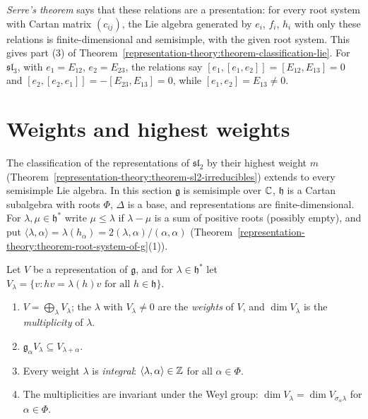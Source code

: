 \emph{Serre's theorem} \cite[Section 18.3]{humphreys-lie} says that these relations are a presentation: for every root system with Cartan matrix $(c_{ij})$, the Lie algebra generated by $e_i$,
$f_i$, $h_i$ with only these relations is finite-dimensional and semisimple, with the given root system. This gives part (3) of
Theorem~\ref{representation-theory:theorem-classification-lie}. For $\mathfrak{sl}_3$, with $e_1 = E_{12}$, $e_2 = E_{23}$, the relations say $[e_1, [e_1, e_2]] = [E_{12}, E_{13}] = 0$ and
$[e_2, [e_2, e_1]] = -[E_{23}, E_{13}] = 0$, while $[e_1, e_2] = E_{13} \neq 0$.

\section{Weights and highest weights}\label{representation-theory:section-highest-weight}

The classification of the representations of $\mathfrak{sl}_2$ by their highest weight $m$ (Theorem~\ref{representation-theory:theorem-sl2-irreducibles}) extends to every semisimple Lie
algebra. In this section $\mathfrak{g}$ is semisimple over $\mathbb{C}$, $\mathfrak{h}$ is a Cartan subalgebra with roots $\Phi$, $\Delta$ is a base, and representations are finite-dimensional.
For $\lambda, \mu \in \mathfrak{h}^*$ write $\mu \leq \lambda$ if $\lambda - \mu$ is a sum of positive roots (possibly empty), and put
$\langle\lambda, \alpha\rangle = \lambda(h_\alpha) = 2(\lambda, \alpha)/(\alpha, \alpha)$ (Theorem~\ref{representation-theory:theorem-root-system-of-g}(1)).

\begin{proposition}\label{representation-theory:proposition-weights}
Let $V$ be a representation of $\mathfrak{g}$, and for $\lambda \in \mathfrak{h}^*$ let $V_\lambda = \{v : hv = \lambda(h)v \text{ for all } h \in \mathfrak{h}\}$.
\begin{enumerate}
\item $V = \bigoplus_\lambda V_\lambda$; the $\lambda$ with $V_\lambda \neq 0$ are the \emph{weights} of $V$, and $\dim V_\lambda$ is the \emph{multiplicity} of $\lambda$.
\item $\mathfrak{g}_\alpha V_\lambda \subseteq V_{\lambda + \alpha}$.
\item Every weight $\lambda$ is \emph{integral}: $\langle\lambda, \alpha\rangle \in \mathbb{Z}$ for all $\alpha \in \Phi$.
\item The multiplicities are invariant under the Weyl group: $\dim V_\lambda = \dim V_{\sigma_\alpha\lambda}$ for $\alpha \in \Phi$.
\end{enumerate}
\end{proposition}


